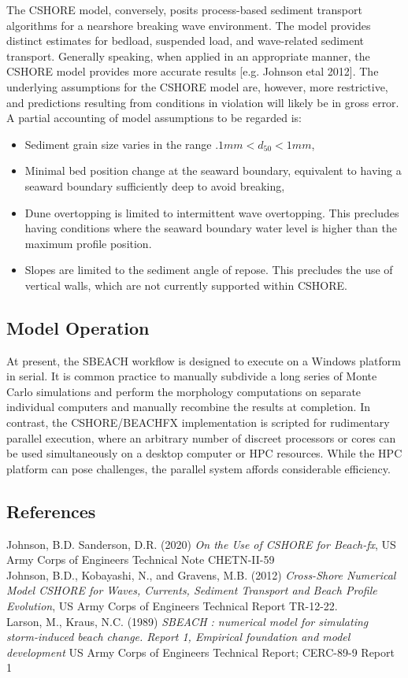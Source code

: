 \documentclass[11pt]{article}
\begin{document}
The CSHORE model, conversely, posits process-based sediment transport
algorithms for a nearshore breaking wave environment. The model
provides distinct estimates for bedload, suspended load, and
wave-related sediment transport.  Generally speaking, when applied in
an appropriate manner, the CSHORE model provides more accurate results
[e.g. Johnson etal 2012].  The underlying assumptions for the CSHORE
model are, however, more restrictive, and predictions resulting from
conditions in violation will likely be in gross error.  A partial
accounting of model assumptions to be regarded is:
\begin{itemize}
\item
  Sediment grain size varies in the range $.1 mm <d_{50}<1 mm$,
\item
  Minimal bed position change at the seaward boundary, equivalent to
  having a seaward boundary sufficiently deep to avoid breaking,
\item
  Dune overtopping is limited to intermittent wave overtopping.  This
  precludes having conditions where the seaward boundary water level
  is higher than the maximum profile position.
\item 
 Slopes are limited to the sediment angle of repose.  This precludes
 the use of vertical walls, which are not currently supported within
 CSHORE.
\end{itemize}

\subsection*{Model Operation} 

At present, the SBEACH workflow is designed to execute on a Windows
platform in serial.  It is common practice to manually subdivide a
long series of Monte Carlo simulations and perform the morphology
computations on separate individual computers and manually recombine
the results at completion.  In contrast, the CSHORE/BEACHFX
implementation is scripted for rudimentary parallel execution, where
an arbitrary number of discreet processors or cores can be used
simultaneously on a desktop computer or HPC resources.  While the HPC
platform can pose challenges, the parallel system affords considerable
efficiency.


\subsection*{References} 

\noindent Johnson, B.D. Sanderson, D.R. (2020) {\it On the Use of CSHORE for
  Beach-fx}, US Army Corps of Engineers Technical Note CHETN-II-59\\[1mm]

\noindent Johnson, B.D., Kobayashi, N., and Gravens, M.B. (2012) {\it
  Cross-Shore Numerical Model CSHORE for Waves, Currents, Sediment
  Transport and Beach Profile Evolution}, US Army Corps of Engineers
Technical Report TR-12-22.\\[1mm]

\noindent Larson, M., Kraus, N.C. (1989) {\it SBEACH : numerical model for
  simulating storm-induced beach change. Report 1, Empirical
  foundation and model development} US Army Corps of Engineers
Technical Report; CERC-89-9 Report 1
\end{document}
